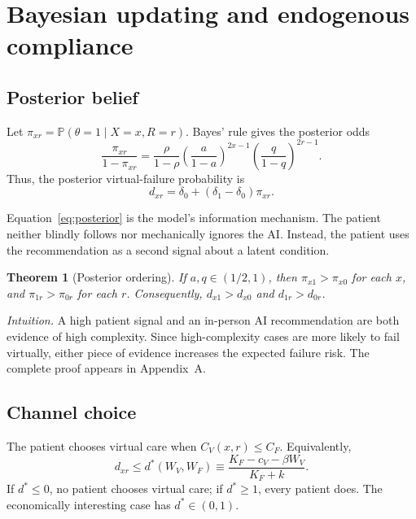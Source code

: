 \documentclass[11pt]{article}
\newcommand{\Prb}{\mathbb{P}}
\newtheorem{theorem}{Theorem}
\begin{document}
\section{Bayesian updating and endogenous compliance}

\subsection{Posterior belief}

Let $\pi_{xr}=\Prb(\theta=1\mid X=x,R=r)$.  Bayes' rule gives the posterior odds
\begin{equation}
 \frac{\pi_{xr}}{1-\pi_{xr}}
 =\frac{\rho}{1-\rho}
 \left(\frac{a}{1-a}\right)^{2x-1}
 \left(\frac{q}{1-q}\right)^{2r-1}.
 \label{eq:posterior}
\end{equation}
Thus, the posterior virtual-failure probability is
\begin{equation}
 d_{xr}=\delta_0+(\delta_1-\delta_0)\pi_{xr}.
 \label{eq:posteriorfailure}
\end{equation}

Equation~\eqref{eq:posterior} is the model's information mechanism.  The patient neither blindly follows nor mechanically ignores the AI.  Instead, the patient uses the recommendation as a second signal about a latent condition.

\begin{theorem}[Posterior ordering]
If $a,q\in(1/2,1)$, then $\pi_{x1}>\pi_{x0}$ for each $x$, and $\pi_{1r}>\pi_{0r}$ for each $r$.  Consequently, $d_{x1}>d_{x0}$ and $d_{1r}>d_{0r}$.
\end{theorem}

\noindent\emph{Intuition.}  A high patient signal and an in-person AI recommendation are both evidence of high complexity.  Since high-complexity cases are more likely to fail virtually, either piece of evidence increases the expected failure risk.  The complete proof appears in Appendix~A.

\subsection{Channel choice}

The patient chooses virtual care when $C_V(x,r)\leq C_F$.  Equivalently,
\begin{equation}
 d_{xr}\leq d^*(W_V,W_F)
 \equiv
 \frac{K_F-c_V-\beta W_V}{K_F+k}.
 \label{eq:cutoff}
\end{equation}
If $d^*\leq 0$, no patient chooses virtual care; if $d^*\geq 1$, every patient does.  The economically interesting case has $d^*\in(0,1)$.
\end{document}
